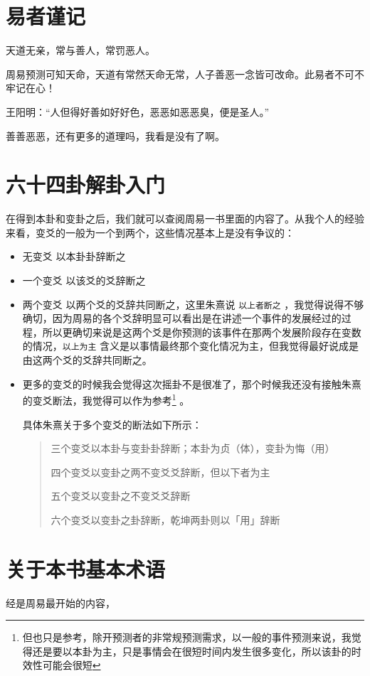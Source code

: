 \documentclass[12pt,oneside]{book}
\begin{document}
\section{易者谨记}
天道无亲，常与善人，常罚恶人。

周易预测可知天命，天道有常然天命无常，人子善恶一念皆可改命。此易者不可不牢记在心！

王阳明：“人但得好善如好好色，恶恶如恶恶臭，便是圣人。”

善善恶恶，还有更多的道理吗，我看是没有了啊。

\section{六十四卦解卦入门}

在得到本卦和变卦之后，我们就可以查阅周易一书里面的内容了。从我个人的经验来看，变爻的一般为一个到两个，这些情况基本上是没有争议的：

\begin{itemize}
\item 无变爻 以本卦卦辞断之
\item 一个变爻 以该爻的爻辞断之
\item 两个变爻 以两个爻的爻辞共同断之，这里朱熹说 \verb+以上者断之+ ，我觉得说得不够确切，因为周易的各个爻辞明显可以看出是在讲述一个事件的发展经过的过程，所以更确切来说是这两个爻是你预测的该事件在那两个发展阶段存在变数的情况，\verb+以上为主+ 含义是以事情最终那个变化情况为主，但我觉得最好说成是由这两个爻的爻辞共同断之。
\item 更多的变爻的时候我会觉得这次摇卦不是很准了，那个时候我还没有接触朱熹的变爻断法，我觉得可以作为参考\footnote{但也只是参考，除开预测者的非常规预测需求，以一般的事件预测来说，我觉得还是要以本卦为主，只是事情会在很短时间内发生很多变化，所以该卦的时效性可能会很短} 。

具体朱熹关于多个变爻的断法如下所示：
\begin{quotation}
三个变爻以本卦与变卦卦辞断；本卦为贞（体），变卦为悔（用）

四个变爻以变卦之两不变爻爻辞断，但以下者为主

五个变爻以变卦之不变爻爻辞断

六个变爻以变卦之卦辞断，乾坤两卦则以「用」辞断
\end{quotation}

\end{itemize}

\section{关于本书基本术语}
经是周易最开始的内容，
\end{document}
